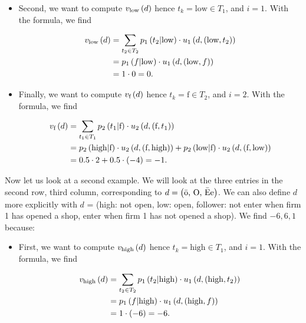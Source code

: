 \begin{enumerate}[label=\alph*.]
\begin{itemize}
     \item Second, we want to compute $v_{\text{low}} \left(d\right)$ hence $t_{k} = \text{low} \in T_1$, and $i = 1$. With the formula, we find
     
     \begin{align*}
         v_{\text{low}} \left(d\right)
        & = \sum_{t_{2} \in T_{2}} p_{1} \left(t_{2}|\text{low}\right) \cdot u_{1} \left(d, (\text{low}, t_{2})\right) \\
        & = p_{1} \left(f|\text{low}\right) \cdot u_{1} \left(d, (\text{low}, f)\right) \\
        & = 1 \cdot 0 = 0.
     \end{align*}
     
     \item Finally, we want to compute $v_{\text{f}} \left(d\right)$ hence $t_{k} = \text{f} \in T_2$, and $i = 2$. With the formula, we find
     
     \begin{align*}
         v_{\text{f}} \left(d\right)
        & = \sum_{t_{1} \in T_{1}} p_2 \left(t_{1}|\text{f}\right) \cdot u_{2} \left(d, (\text{f}, t_{1})\right) \\
        & = p_2 \left(\text{high}|\text{f}\right) \cdot u_{2} \left(d, (\text{f}, \text{high})\right)
        + p_2 \left(\text{low}|\text{f}\right) \cdot u_{2} \left(d, (\text{f}, \text{low})\right) \\
        & = 0.5 \cdot 2 + 0.5 \cdot (-4) = -1.
     \end{align*}
\end{itemize}



Now let us look at a second example. We will look at the three entries in the second row, third column, corresponding to $d = \left(\text{\=o, O, \=Ee}\right)$. We can also define $d$ more explicitly with $d$ = (high: not open, low: open, follower: not enter when firm 1 has opened a shop, enter when firm 1 has not opened a shop). We find $-6, 6, 1$ because:
\begin{itemize}
     \item First, we want to compute $v_{\text{high}} \left(d\right)$ hence $t_{k} = \text{high} \in T_1$, and $i = 1$. With the formula, we find
     
     \begin{align*}
         v_{\text{high}} \left(d\right)
        & = \sum_{t_{2} \in T_{2}} p_{1} \left(t_{2}|\text{high}\right) \cdot u_{1} \left(d, (\text{high}, t_{2})\right) \\
        & = p_{1} \left(f|\text{high}\right) \cdot u_{1} \left(d, (\text{high}, f)\right) \\
        & = 1 \cdot (- 6) = -6.
     \end{align*}
     

\end{itemize}
\end{enumerate}
